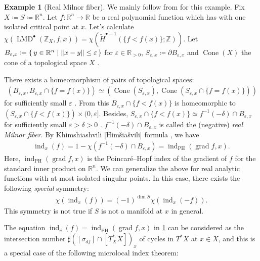 \documentclass[a4paper,dvipdfmx,reqno,12pt]{amsart}
\theoremstyle{definition}
\newtheorem{example}[theorem]{Example}
\newcommand{\deq}{\coloneqq}
\newcommand{\Z}{\mathbb{Z}}%
\newcommand{\vep}{\varepsilon}%
\newcommand{\opn}[1]{\operatorname{#1}}
\numberwithin{equation}{section}
\begin{document}
\begin{example}[{Real Milnor fiber}] 
\label{example-milnor-morse-data}
We mainly follow from \cite[3.2]{MR3779558} for this example.
Fix $X\deq S\deq \mathbb{R}^{n}$.
Let $f\colon {\mathbb{R}}^{n}\to {\mathbb{R}}$ be a real polynomial function
which has with one isolated critical point at $x$.
Let's calculate 
$\chi (\opn{LMD}^{\bullet}(\Z_X,f,x))
=\chi(\tilde{H}^{\bullet-1}(\{f<f(x)\};\Z))$.
Let $B_{\vep,x}\deq \set{y\in {\mathbb{R}}^{n}\mid \|x-y\|\leq \vep}$
for $\vep \in \mathbb{R}_{> 0}$,
$S_{\vep,x}\deq\partial B_{\vep,x}$ and 
$\opn{Cone}(X)$ the cone of a topological space $X$
\cite[Example 4.4]{hatcherAlgebraicTopology2002a}.

There exists a homeomorphism of pairs of
topological spaces:
\begin{align}
(B_{\vep,x},B_{\vep,x}\cap \{f=f(x)\})\simeq 
(\opn{Cone}(S_{\vep,x}),\opn{Cone}(S_{\vep,x}\cap \{f=f(x)\}))
\end{align}
for sufficiently small $\vep$
\cite[Theorem 2.10]{MR0239612}.
From this $B_{\vep,x}\cap\{f<f(x)\}$ is homeomorphic to
$(S_{\vep,x}\cap \{f<f(x)\})\times (0,\vep]$.
Besides, $S_{\vep,x}\cap \{f<f(x)\}\simeq 
f^{-1}(-\delta)\cap B_{\vep,x}$
for sufficiently small $\vep>\delta>0$ 
\cite[Lemma 5.10]{MR0239612}.
$f^{-1}(-\delta)\cap B_{\vep,x}$ is called 
the (negative) \emph{real Milnor fiber}.
By Khimshiashvili [Himšiašvili] formula \cite{MR0458467}, we have
\begin{align} \label{equation-Khimshiashvili}
  \opn{ind}_x(f)
=1-\chi(f^{-1}(-\delta)\cap B_{\vep,x})
=\opn{ind}_{\opn{PH}}(\opn{grad} f,x).
\end{align}
Here, $\opn{ind}_{\opn{PH}}(\opn{grad} f,x)$ is the 
Poincar\'e--Hopf index of the gradient of $f$ for the standard 
inner product on ${\mathbb{R}}^{n}$.
We can generalize the above for real analytic functions with 
at most isolated singular points. 
In this case, there exists the following \emph{special} symmetry:
\begin{align}
\chi(\opn{ind}_x(f))=
(-1)^{\dim S}\chi(\opn{ind}_x(-f)).
\end{align}
This symmetry is not true if $S$ is not a manifold at $x$
in general. 
\end{example}

The equation $\opn{ind}_v(f)=
\opn{ind}_{\opn{PH}}(\opn{grad} f,x)$ in 
\cref{example-milnor-morse-data}
can be considered 
as the intersection number 
$\sharp ([\sigma_{df}]\cap [T^{*}_X X])_x$ of cycles in $T^{*}X$
at $x\in X$,
and this is a special case of
the following microlocal index theorem:
\end{document}
